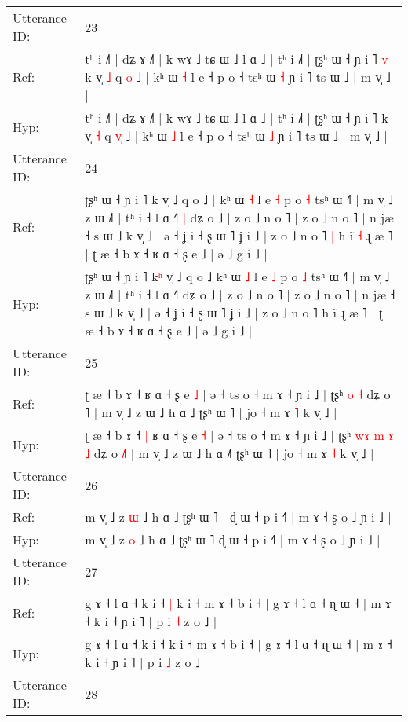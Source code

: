 \documentclass[10pt]{article}
\DeclareRobustCommand{\hl}[1]{{\textcolor{red}{#1}}}
\begin{document}
\begin{longtable}{ll}
 \\
\midrule
Utterance ID: & 23 \\
Ref: & tʰ i ˩˥ | dʑ ɤ ˩˥ | k wɤ ˩ tɕ ɯ ˩ l ɑ ˩ | tʰ i ˩˥ | ʈʂʰ ɯ ˧ ɲ i ˥\hl{ }\hl{v} k v̩ \hl{˩} q \hl{}\hl{o} ˩ | kʰ ɯ \hl{˧} l e ˧ p o ˧ tsʰ ɯ \hl{˧} ɲ i ˥ ts ɯ ˩ | m v̩ ˩ |
 \\
Hyp: & tʰ i ˩˥ | dʑ ɤ ˩˥ | k wɤ ˩ tɕ ɯ ˩ l ɑ ˩ | tʰ i ˩˥ | ʈʂʰ ɯ ˧ ɲ i ˥\hl{}\hl{} k v̩ \hl{˧} q \hl{v}\hl{̩} ˩ | kʰ ɯ \hl{˩} l e ˧ p o ˧ tsʰ ɯ \hl{˩} ɲ i ˥ ts ɯ ˩ | m v̩ ˩ |
 \\
\midrule
Utterance ID: & 24 \\
Ref: & ʈʂʰ ɯ ˧ ɲ i ˥ k\hl{} v̩ ˩ q o ˩\hl{ }\hl{|} kʰ ɯ \hl{˧} l e \hl{˧} p o \hl{˧} tsʰ ɯ ˧˥ | m v̩ ˩ z ɯ ˩˥ | tʰ i ˧ l ɑ ˧˥\hl{ }\hl{|} dʑ o ˩ | z o ˩ n o ˥ | z o ˩ n o ˥ | n jæ ˧ s ɯ ˩ k v̩ ˩ | ə ˧ ʝ i ˧ ʂ ɯ ˥ ʝ i ˩ | z o ˩ n o ˥\hl{ }\hl{|} h ĩ\hl{ }\hl{˧} ɻ æ ˥ | ʈ æ ˧ b ɤ ˧ ʁ ɑ ˧ ʂ e ˩ | ə ˩ g i ˩ |
 \\
Hyp: & ʈʂʰ ɯ ˧ ɲ i ˥ k\hl{ʰ} v̩ ˩ q o ˩\hl{}\hl{} kʰ ɯ \hl{˩} l e \hl{˩} p o \hl{˩} tsʰ ɯ ˧˥ | m v̩ ˩ z ɯ ˩˥ | tʰ i ˧ l ɑ ˧˥\hl{}\hl{} dʑ o ˩ | z o ˩ n o ˥ | z o ˩ n o ˥ | n jæ ˧ s ɯ ˩ k v̩ ˩ | ə ˧ ʝ i ˧ ʂ ɯ ˥ ʝ i ˩ | z o ˩ n o ˥\hl{}\hl{} h ĩ\hl{}\hl{} ɻ æ ˥ | ʈ æ ˧ b ɤ ˧ ʁ ɑ ˧ ʂ e ˩ | ə ˩ g i ˩ |
 \\
\midrule
Utterance ID: & 25 \\
Ref: & ʈ æ ˧ b ɤ ˧\hl{}\hl{} ʁ ɑ ˧ ʂ e \hl{˩} | ə ˧ ts o ˧ m ɤ ˧ ɲ i ˩ | ʈʂʰ\hl{}\hl{}\hl{}\hl{}\hl{} \hl{o} \hl{˧} dʑ o \hl{}˥ | m v̩ ˩ z ɯ ˩ h ɑ ˩\hl{} ʈʂʰ ɯ ˥ | jo ˧ m ɤ \hl{˥} k v̩ ˩ |
 \\
Hyp: & ʈ æ ˧ b ɤ ˧\hl{ }\hl{|} ʁ ɑ ˧ ʂ e \hl{˧} | ə ˧ ts o ˧ m ɤ ˧ ɲ i ˩ | ʈʂʰ\hl{ }\hl{w}\hl{ɤ}\hl{ }\hl{m} \hl{ɤ} \hl{˩} dʑ o \hl{˩}˥ | m v̩ ˩ z ɯ ˩ h ɑ ˩\hl{˥} ʈʂʰ ɯ ˥ | jo ˧ m ɤ \hl{˧} k v̩ ˩ |
 \\
\midrule
Utterance ID: & 26 \\
Ref: & m v̩ ˩ z \hl{ɯ} ˩ h ɑ ˩ ʈʂʰ ɯ ˥\hl{ }\hl{|} ɖ ɯ ˧ p i ˧˥ | m ɤ ˧ ʂ o ˩ ɲ i ˩ |
 \\
Hyp: & m v̩ ˩ z \hl{o} ˩ h ɑ ˩ ʈʂʰ ɯ ˥\hl{}\hl{} ɖ ɯ ˧ p i ˧˥ | m ɤ ˧ ʂ o ˩ ɲ i ˩ |
 \\
\midrule
Utterance ID: & 27 \\
Ref: & g ɤ ˧ l ɑ ˧ k i ˧\hl{ }\hl{|} k i ˧ m ɤ ˧ b i ˧ | g ɤ ˧ l ɑ ˧ ɳ ɯ ˧ | m ɤ ˧ k i ˧ ɲ i ˥ | p i \hl{˧} z o ˩ |
 \\
Hyp: & g ɤ ˧ l ɑ ˧ k i ˧\hl{}\hl{} k i ˧ m ɤ ˧ b i ˧ | g ɤ ˧ l ɑ ˧ ɳ ɯ ˧ | m ɤ ˧ k i ˧ ɲ i ˥ | p i \hl{˩} z o ˩ |
 \\
\midrule
Utterance ID: & 28 \\

\end{longtable}
\end{document}
